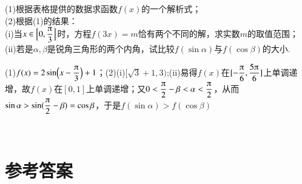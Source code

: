 \begin{exercise}
\begin{center}
      \end{center}
      (1)根据表格提供的数据求函数$f(x)$的一个解析式；\\
      (2)根据(1)的结果：\\
      \;(i)当$x\in\Bigl[0,\dfrac{\piup}3\Bigr]$时，方程$f(3x)=m$恰有两个不同的解，求实数$m$的取值范围；\\
      \;(ii)若是$\alpha,\beta$是锐角三角形的两个内角，试比较$f(\sin \alpha)$与$f(\cos \beta)$的大小.
      \begin{answer}
        (1)$f(x)=2\sin\Bigl(x-\dfrac{\piup}3\Bigr)+1$；(2)(i)$[\sqrt{3}+1,3)$;(ii)易得$f(x)$在$[-\dfrac{\piup}6,\dfrac{5\piup}6]$上单调递增，故$f(x)$在$[0,1]$上单调递增；又$0<\dfrac{\piup}2-\beta<\alpha<\dfrac{\piup}2$，从而$\sin\alpha>\sin(\dfrac{\piup}2-\beta)=\cos\beta$，于是$f(\sin \alpha)>f(\cos \beta)$
      \end{answer}
    \vspace{6.5cm}
  \end{exercise}
  \stopexercise
\hspace{2em}
\newpage
{}\\
\part{\mbox{\heiti \xiaoer 参考答案}}
  \begin{multicols}{2}
    \printanswer
  \end{multicols}
